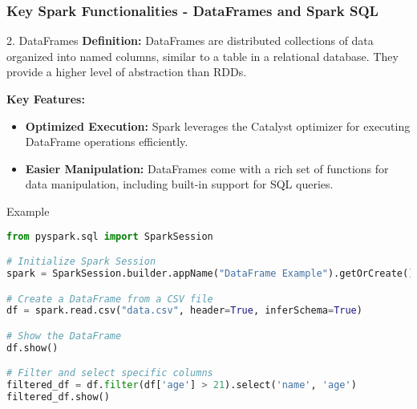 \documentclass[aspectratio=169]{beamer}
\begin{document}
\begin{frame}[fragile]
    \frametitle{Key Spark Functionalities - DataFrames and Spark SQL}
    \begin{block}{2. DataFrames}
        \textbf{Definition:} DataFrames are distributed collections of data organized into named columns, similar to a table in a relational database. They provide a higher level of abstraction than RDDs.

        \textbf{Key Features:}
        \begin{itemize}
            \item \textbf{Optimized Execution:} Spark leverages the Catalyst optimizer for executing DataFrame operations efficiently.
            \item \textbf{Easier Manipulation:} DataFrames come with a rich set of functions for data manipulation, including built-in support for SQL queries.
        \end{itemize}
    \end{block}
    
    \begin{block}{Example}
        \begin{lstlisting}[language=Python]
from pyspark.sql import SparkSession

# Initialize Spark Session
spark = SparkSession.builder.appName("DataFrame Example").getOrCreate()

# Create a DataFrame from a CSV file
df = spark.read.csv("data.csv", header=True, inferSchema=True)

# Show the DataFrame
df.show()

# Filter and select specific columns
filtered_df = df.filter(df['age'] > 21).select('name', 'age')
filtered_df.show()
        \end{lstlisting}
    \end{block}
\end{frame}
\end{document}
